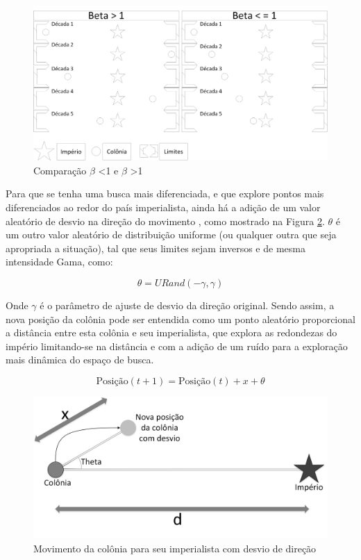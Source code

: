 \begin{figure}[h]
	\centering	
	\includegraphics[scale=0.5]{Figuras/Ilustrations-BetaComparison.png}
	\caption{Comparação $\beta$ \textless 1 e $\beta$ \textgreater 1}
	\label{fig:Ilustrations-BetaComparison}
\end{figure}

Para que se tenha uma busca mais diferenciada, e que explore pontos mais diferenciados ao redor do país imperialista, ainda há a adição de um valor aleatório de desvio na direção do movimento , como mostrado na Figura \ref{fig:Ilustrations-ColonyEmpireMoveWithDistortion}. \(\theta\) é um outro valor aleatório de distribuição uniforme (ou qualquer outra que seja apropriada a situação), tal que seus limites sejam inversos e de mesma intensidade Gama, como:

\begin{equation}
\label{eq:ica8}
\theta = URand(-\gamma, \gamma)
\end{equation}

Onde \(\gamma\) é o parâmetro de ajuste de desvio da direção original. Sendo assim, a nova posição da colônia pode ser entendida como um ponto aleatório proporcional a distância entre esta colônia e seu imperialista, que explora as redondezas do império limitando-se na distância e com a adição de um ruído para a exploração mais dinâmica do espaço de busca.

\begin{equation}
\label{eq:ica9}
\text{Posição} (t+1) = \text{Posição}(t) + x + \theta
\end{equation}

\begin{figure}[h]
	\centering	
	\includegraphics[scale=0.5]{Figuras/Ilustrations-ColonyEmpireMoveWithDistortion.png}
	\caption{Movimento da colônia para seu imperialista com desvio de direção}
	\label{fig:Ilustrations-ColonyEmpireMoveWithDistortion}
\end{figure}

